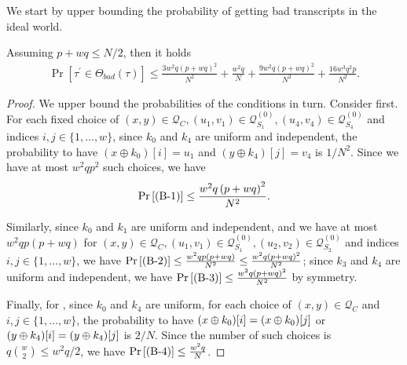 We start by upper bounding the probability of getting bad transcripts in the ideal world.

\begin{lemma}
	\label{lemma:bad-tau-4-rounds}
	
	Assuming $p+wq\leq N/2$, then it holds
	\begin{align}
	\operatorname{Pr}[\tau^{\prime} \in \Theta_{bad}(\tau)] \leq \frac{3w^{2} q \left(p+w q\right)^{2}}{N^{2}} + \frac{w^{2} q}{N} + \frac{9w^2 q (p+w q)^{2}}{N^2}+ \frac{16w^3q^2p}{N^2}.
	\label{eq:bound-bad-tau-4-rounds}
	\end{align}
\end{lemma}
\begin{proof}
We upper bound the probabilities of the conditions in turn. Consider \bone first. For each fixed choice of $(x, y) \in \mathcal{Q}_{C}, \left(u_{1}, v_{1}\right) \in \mathcal{Q}_{S_{1}}^{(0)}, \left(u_{4}, v_{4}\right) \in \mathcal{Q}_{S_{4}}^{(0)}$ and indices $i, j \in \{1, \ldots, w\}$, since $k_{0}$ and $k_{4}$ are uniform and independent, the probability to have $(x \oplus k_{0})[i]=u_1$ and $(y \oplus k_{4})[j]=v_4$ is $1/N^2$. Since we have at most $w^{2}qp^2$ such choices, we have
%
$$
\operatorname{Pr}\left[\text{(B-1)}\right] \leq \frac{w^{2} q \left(p+w q\right)^{2}}{N^{2}}.
$$
%

Similarly, since $k_{0}$ and $k_{1}$ are uniform and independent, and we have at most $w^{2} q p \left(p+w q\right)$ for $(x, y) \in \mathcal{Q}_{C}, \left(u_{1}, v_{1}\right) \in \mathcal{Q}_{S_{1}}^{(0)}, \left(u_{2}, v_{2}\right) \in \mathcal{Q}_{S_{2}}^{(0)}$ and indices $i, j \in \{1, \ldots, w\}$, we have $\operatorname{Pr}\left[\text{(B-2)}\right] \leq \frac{w^{2} q p \left(p+w q\right)}{N^{2}}\leq\frac{w^{2} q \left(p+w q\right)^{2}}{N^{2}}$; since $k_3$ and $k_4$ are uniform and independent, we have $\operatorname{Pr}\left[\text{(B-3)}\right] \leq \frac{w^{2} q \left(p+w q\right)^{2}}{N^{2}}$ by symmetry.


Finally, for \bfour, since $k_{0}$ and $k_{4}$ are uniform, for each choice of $(x,y) \in \mathcal{Q}_{C}$ and $i, j \in \{1, \ldots, w\}$, the probability to have $(x\oplus k_0)[i]=(x\oplus k_0)[j]$ or $(y\oplus k_4)[i]=(y\oplus k_4)[j]$ is $2/N$. Since the number of such choices is $q{w\choose 2}\leq w^2q/2$, we have $\operatorname{Pr}\left[\text{(B-4)}\right] \leq \frac{w^{2} q}{N}$.






\end{proof}
